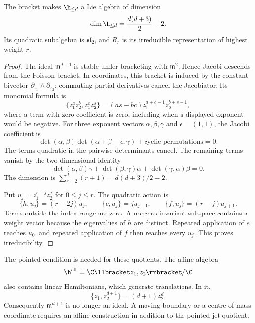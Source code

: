 \begin{proposition}\label{prop:vol2-finite-jets}
The bracket makes $\h_{\leq d}$ a Lie algebra of dimension
\[
 \dim\h_{\leq d}=\frac{d(d+3)}2-2.
\]
Its quadratic subalgebra is $\mathfrak{sl}_2$, and
$R_r$ is its irreducible representation of highest weight $r$.
\end{proposition}

\begin{proof}
The ideal $\mathfrak m^{d+1}$ is stable under bracketing with
$\mathfrak m^2$. Hence Jacobi descends from the Poisson bracket.
In coordinates, this bracket is induced by the constant bivector
$\partial_{z_1}\wedge\partial_{z_2}$; commuting partial derivatives
cancel the Jacobiator. Its monomial formula is
\begin{equation}\label{eq:vol2-monomial-bracket}
 \{z_1^az_2^b,z_1^cz_2^s\}
 =(as-bc)z_1^{a+c-1}z_2^{b+s-1},
\end{equation}
where a term with zero coefficient is zero, including when a displayed
exponent would be negative. For three exponent vectors
$\alpha,\beta,\gamma$ and $\epsilon=(1,1)$, the Jacobi coefficient is
\[
 \det(\alpha,\beta)\det(\alpha+\beta-\epsilon,\gamma)
 +\text{cyclic permutations}=0.
\]
The terms quadratic in the pairwise determinants cancel. The remaining
terms vanish by the two-dimensional identity
\[
 \det(\alpha,\beta)\gamma+\det(\beta,\gamma)\alpha
 +\det(\gamma,\alpha)\beta=0.
\]
The dimension is $\sum_{r=2}^d(r+1)=d(d+3)/2-2$.

Put $u_j=z_1^{r-j}z_2^j$ for $0\leq j\leq r$. The quadratic action is
\begin{equation}\label{eq:vol2-weight-action}
 \{h,u_j\}=(r-2j)u_j,\qquad
 \{e,u_j\}=ju_{j-1},\qquad
 \{f,u_j\}=(r-j)u_{j+1}.
\end{equation}
Terms outside the index range are zero. A nonzero invariant subspace
contains a weight vector because the eigenvalues of $h$ are distinct.
Repeated application of $e$ reaches $u_0$, and repeated application of
$f$ then reaches every $u_j$. This proves irreducibility.
\end{proof}

The pointed condition is needed for these quotients. The affine algebra
\[
 \h^{\mathrm{aff}}=\C\llbracket z_1,z_2\rrbracket/\C
\]
also contains linear Hamiltonians, which generate translations. In it,
\[
 \{z_1,z_2^{d+1}\}=(d+1)z_2^d.
\]
Consequently $\mathfrak m^{d+1}$ is no longer an ideal. A moving
boundary or a centre-of-mass coordinate requires an affine construction
in addition to the pointed jet quotient.

